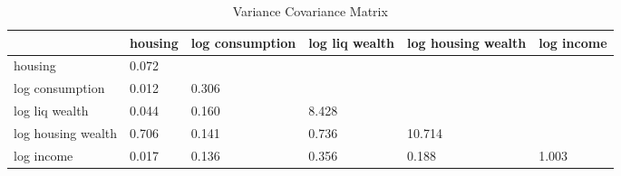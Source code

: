 \begin{table}[htbp]
\caption{\label{clabel} Variance Covariance Matrix}\centering\medskip
\begin{tabular}{llllll} \hline \hline
 & housing  & log consumption  & log liq wealth  & log housing wealth  & log income  \\  \hline 
housing &     0.072 \\  
log consumption &     0.012 &     0.306 \\  
log liq wealth &     0.044 &     0.160 &     8.428 \\  
log housing wealth &     0.706 &     0.141 &     0.736 &    10.714 \\  
log income &     0.017 &     0.136 &     0.356 &     0.188 &     1.003 \\  
\hline \hline \end{tabular}
\end{table}
